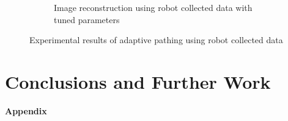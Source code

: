 \documentclass[english]{article}\usepackage[]{graphicx}\usepackage[]{color}
\begin{document}
\begin{figure}
\begin{subfigure}{.3\textwidth}
  \caption{Image reconstruction using robot collected data with tuned parameters}
  \vspace{0pt}
  \label{adp_exp_recon_tuned}
\end{subfigure}
\caption{Experimental results of adaptive pathing using robot collected data}
\label{adp_exp_fig}
\end{figure}

\section{Conclusions and Further Work}

\newpage




\newpage
\textbf{Appendix}
\end{document}
